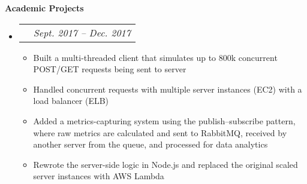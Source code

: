 \documentclass{article}
\makeatletter
\newcommand{\resitem}[1]{
    \item #1
    \vspace{-2pt}
}
\newcommand{\resheading}[1]{{\large \colorbox{mygrey}{\begin{minipage}{\textwidth}{\textbf{#1 \vphantom{p\^{E}}}}\end{minipage}}}}
\newcommand{\ressubheadingproj}[2]{
\begin{tabular*}{6.80in}{l@{\extracolsep{\fill}}r}
    \textbf{#1} & \textit{#2} \\
\end{tabular*}\vspace{-6pt}}
\makeatother
\begin{document}

    \resheading{Academic Projects}

    \begin{itemize}
        \item\ressubheadingproj
        {\href
            {https://github.com/jeremylinlin/cs6650-scalable-distributed-systems}
            {Distributed Ski Data Processing Engine}
        }
        {Sept. 2017 -- Dec. 2017}
        {\footnotesize
        \begin{itemize}
            \resitem
            {Built a multi-threaded client that simulates up to 800k concurrent POST/GET
            requests being sent to server}
            \resitem
            {Handled concurrent requests with multiple server instances (EC2)
            with a load balancer (ELB)}
            \resitem
            {Added a metrics-capturing system using the publish--subscribe pattern, where
            raw metrics are calculated and sent to RabbitMQ, received by another server
            from the queue, and processed for data analytics}
            \resitem
            {Rewrote the server-side logic in Node.js and replaced the original scaled server
            instances with AWS Lambda}

        \end{itemize}
        }
    \end{itemize}
\end{document}
